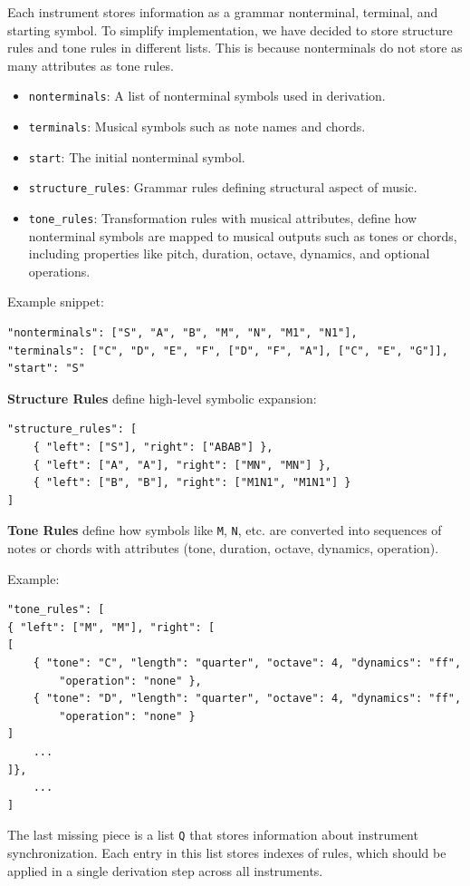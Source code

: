 Each instrument stores information as a grammar nonterminal, terminal, and starting symbol. To simplify implementation, we have decided to store structure rules and tone rules in different lists. This is because nonterminals do not store as many attributes as tone rules.

\begin{itemize}
\item \texttt{nonterminals}: A list of nonterminal symbols used in derivation.
\item \texttt{terminals}: Musical symbols such as note names and chords.
\item \texttt{start}: The initial nonterminal symbol.
\item \texttt{structure\_rules}: Grammar rules defining structural aspect of music.
\item \texttt{tone\_rules}: Transformation rules with musical attributes, define how nonterminal symbols are mapped to musical outputs such as tones or chords, including properties like pitch, duration, octave, dynamics, and optional operations.
\end{itemize}

Example snippet:
\begin{verbatim}
"nonterminals": ["S", "A", "B", "M", "N", "M1", "N1"],
"terminals": ["C", "D", "E", "F", ["D", "F", "A"], ["C", "E", "G"]],
"start": "S"
\end{verbatim}

\textbf{Structure Rules} define high-level symbolic expansion:
\begin{verbatim}
"structure_rules": [
    { "left": ["S"], "right": ["ABAB"] },
    { "left": ["A", "A"], "right": ["MN", "MN"] },
    { "left": ["B", "B"], "right": ["M1N1", "M1N1"] }
]
\end{verbatim}

\textbf{Tone Rules} define how symbols like \texttt{M}, \texttt{N}, etc. are converted into sequences of notes or chords with attributes (tone, duration, octave, dynamics, operation).

Example:
\begin{verbatim}
"tone_rules": [
{ "left": ["M", "M"], "right": [
[   
    { "tone": "C", "length": "quarter", "octave": 4, "dynamics": "ff", 
        "operation": "none" },
    { "tone": "D", "length": "quarter", "octave": 4, "dynamics": "ff", 
        "operation": "none" }
]
    ...
]},
    ...
]
\end{verbatim}
The last missing piece is a list \texttt{Q} that stores information about instrument synchronization. Each entry in this list stores indexes of rules, which should be applied in a single derivation step across all instruments.

